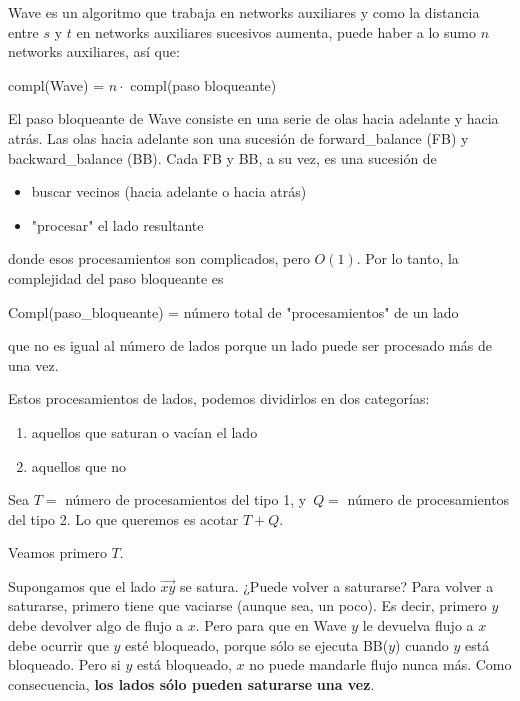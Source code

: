 \documentclass[10pt,a4paper]{article}
\begin{document}
Wave es un algoritmo que trabaja en networks auxiliares y como la distancia entre $s$ y $t$ en networks auxiliares sucesivos aumenta, puede haber a lo sumo $n$ networks auxiliares, así que:

\begin{center}
compl(Wave) = $n \cdot$ compl(paso bloqueante)
\end{center}

El paso bloqueante de Wave consiste en una serie de olas hacia adelante y hacia atrás. Las olas hacia adelante son una sucesión de forward_balance (FB) y backward_balance (BB). Cada FB y BB, a su vez, es una sucesión de

\begin{itemize}

	\item buscar vecinos (hacia adelante o hacia atrás)
	\item "procesar" el lado resultante
\end{itemize}

donde esos procesamientos son complicados, pero $O(1)$. Por lo tanto, la complejidad del paso bloqueante es

\begin{center}
Compl(paso_bloqueante) = número total de "procesamientos" de un lado
\end{center}

que no es igual al número de lados porque un lado puede ser procesado más de una vez.

Estos procesamientos de lados, podemos dividirlos en dos categorías:

\begin{enumerate}

	\item aquellos que saturan o vacían el lado
	\item aquellos que no
\end{enumerate}

Sea $T =$ número de procesamientos del tipo 1, y $Q = $ número de procesamientos del tipo 2. Lo que queremos es acotar $T + Q$.

Veamos primero $T$.

Supongamos que el lado $\overrightarrow{xy}$ se satura. ¿Puede volver a saturarse? Para volver a saturarse, primero tiene que vaciarse (aunque sea, un poco). Es decir, primero $y$ debe devolver algo de flujo a $x$. Pero para que en Wave $y$ le devuelva flujo a $x$ debe ocurrir que $y$ esté bloqueado, porque sólo se ejecuta BB($y$) cuando $y$ está bloqueado. Pero si $y $ está bloqueado, $x$ no puede mandarle flujo nunca más. Como consecuencia, \textbf{los lados sólo pueden saturarse} \textbf{una vez}.
\end{document}
